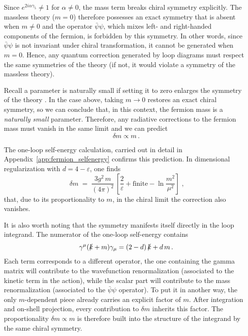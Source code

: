 \documentclass[a4paper, 11pt]{article}
\begin{document}
Since $e^{2i\alpha\gamma_5} \neq 1$ for $\alpha \neq 0$, the mass term breaks chiral symmetry explicitly. The massless theory ($m = 0$) therefore possesses an exact symmetry that is absent when $m \neq 0$ and the operator $\bar{\psi}\psi$, which mixes left- and right-handed components of the fermion, is forbidden by this symmetry. In other words, since $\bar\psi \psi$ is not invariant under chiral transformation, it cannot be generated when $m=0$. 
Hence, any quantum correction generated by loop diagrams must respect the same symmetries of the theory (if not, it would violate a symmetry of the massless theory).

Recall a parameter is naturally small if setting it to zero enlarges the symmetry of the theory \cite{CraigNaturalness, KorenHierarchy}. In the case above, taking $m \to 0$ restores an exact chiral symmetry, so we can conclude that, in this context, the fermion mass is a \textit{naturally small} parameter. Therefore, any radiative corrections to the fermion mass must vanish in the same limit and we can predict
\begin{equation*}
  \delta m \propto m\,.
  \label{eq:deltam_prediction}
\end{equation*}

The one-loop self-energy calculation, carried out in detail in Appendix~\ref{app:fermion_selfenergy} confirms this prediction. In dimensional regularization with $d = 4 - \varepsilon$, one finds
\begin{equation*}
    \;\delta m \;=\; \frac{3g^2\,m}{(4\pi)^2}\,
    \left[\frac{2}{\varepsilon} + \text{finite} - \ln\!\frac{m^2}{\mu^2}\right]\;,
\end{equation*}
that, due to its proportionality to $m$, in the chiral limit the correction also vanishes.

It is also worth noting that the symmetry manifests itself directly in the loop integrand. The numerator of the one-loop self-energy contains
\begin{equation*}
  \gamma^\mu(\slashed{k} + m)\gamma_\mu = (2-d)\,\slashed{k} + d\,m\,.
  \label{eq:dirac_structure}
\end{equation*}
Each term corresponds to a different operator, the one containing the gamma matrix will contribute to the wavefunction renormalization (associated to the kinetic term in the action), while the scalar part will contribute to the mass renormalization (associated to the $\bar\psi \psi$ operator). To put it in another way, the only $m$-dependent piece already carries an explicit factor of $m$. After integration and on-shell projection, every contribution to $\delta m$ inherits this factor. The proportionality $\delta m \propto m$ is therefore built into the structure of the integrand by the same chiral symmetry.
\end{document}

